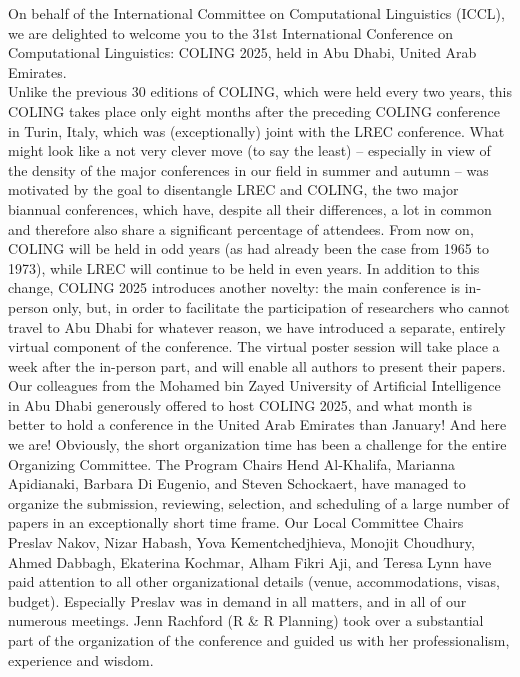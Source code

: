 On behalf of the International Committee on Computational Linguistics (ICCL), we are delighted to welcome you to the 31st International Conference on Computational Linguistics: COLING 2025, held in Abu Dhabi, United Arab Emirates.\\

Unlike the previous 30 editions of COLING, which were held every two years, this COLING takes place only eight months after the preceding COLING conference in Turin, Italy, which was (exceptionally) joint with the LREC conference. What might look like a not very clever move (to say the least) – especially in view of the density of the major conferences in our field in summer and autumn – was motivated by the goal to disentangle LREC and COLING, the two major  biannual conferences, which have, despite all their differences, a lot in common and therefore also share a significant percentage of attendees.  From now on, COLING will be held in odd years (as had already been the case from 1965 to 1973), while LREC will continue to be held in even years. In addition to this change, COLING 2025 introduces another novelty: the main conference is in-person only, but, in order to facilitate the participation of researchers who cannot travel to Abu Dhabi for whatever reason, we have introduced a separate, entirely virtual component of the conference. The virtual poster session will take place a week after the in-person part, and will enable all authors to present their papers.\\

Our colleagues from the Mohamed bin Zayed University of Artificial Intelligence in Abu Dhabi generously offered to host COLING 2025, and what month is better to hold a conference in the United Arab Emirates than January! And here we are! Obviously, the short organization time has been a challenge for the entire Organizing Committee.  The Program Chairs Hend Al-Khalifa, Marianna Apidianaki, Barbara Di Eugenio, and Steven Schockaert, have managed to organize the submission, reviewing, selection, and scheduling of a large number of papers in an exceptionally short time frame. Our Local Committee Chairs Preslav Nakov, Nizar Habash, Yova Kementchedjhieva, Monojit Choudhury, Ahmed Dabbagh, Ekaterina Kochmar, Alham Fikri Aji, and Teresa Lynn have paid attention to all other organizational details (venue, accommodations, visas, budget). Especially Preslav was in demand in all matters, and in all of our numerous meetings. Jenn Rachford (R \& R Planning) took over a substantial part of the organization of the conference and guided us with her professionalism, experience and wisdom. \\

